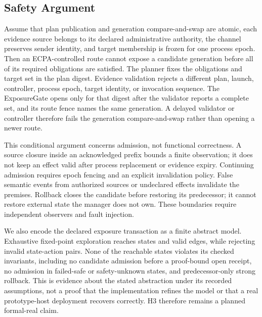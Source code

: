\documentclass[letterpaper,twocolumn,10pt]{article}
\begin{document}
\subsection{Safety Argument}
Assume that plan publication and generation compare-and-swap are atomic, each
evidence source belongs to its declared administrative authority, the channel
preserves sender identity, and target membership is frozen for one process
epoch.  Then an ECPA-controlled route
cannot expose a candidate generation before all of its required obligations
are satisfied.  The planner fixes the obligations and target set in the plan
digest.  Evidence validation rejects a different plan, launch, controller,
process epoch, target identity, or invocation sequence.  The ExposureGate
opens only for that digest after the validator reports a complete set, and its
route fence names the same generation.  A delayed validator or controller
therefore fails the generation compare-and-swap rather than opening a newer
route.

This conditional argument concerns admission, not functional correctness.
A source closure inside an acknowledged prefix bounds a finite observation;
it does not keep an effect valid after process replacement or evidence expiry.
Continuing admission requires epoch fencing and an explicit invalidation policy.
False semantic events from authorized sources or undeclared effects invalidate
the premises.  Rollback closes the candidate before restoring its predecessor;
it cannot restore external state the manager does not own.  These boundaries
require independent observers and fault injection.

We also encode the declared exposure transaction as a finite abstract model.
Exhaustive fixed-point exploration reaches \ECPATransactionModelStates{} states
and \ECPATransactionModelEdges{} valid edges, while rejecting
\ECPATransactionModelRejections{} invalid state-action pairs.  None of the
reachable states violates its \ECPATransactionModelInvariants{} checked
invariants, including no candidate admission before a proof-bound open receipt,
no admission in failed-safe or safety-unknown states, and predecessor-only
strong rollback.  This is evidence about the stated abstraction under its
recorded assumptions, not a proof that the implementation refines the model or
that a real prototype-host deployment recovers correctly.  H3 therefore remains a
planned formal-real claim.
\end{document}
